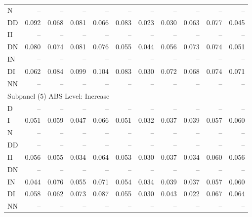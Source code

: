 {\begin{tabular}{lrrrrrrrrrr}
N      &    -- &    -- &    -- &    -- &     -- &     -- &     -- &     -- &     -- &     -- \\
DD     & 0.092 & 0.068 & 0.081 & 0.066 &  0.083 &  0.023 &  0.030 &  0.063 &  0.077 &  0.045 \\
II     &    -- &    -- &    -- &    -- &     -- &     -- &     -- &     -- &     -- &     -- \\
DN     & 0.080 & 0.074 & 0.081 & 0.076 &  0.055 &  0.044 &  0.056 &  0.073 &  0.074 &  0.051 \\
IN     &    -- &    -- &    -- &    -- &     -- &     -- &     -- &     -- &     -- &     -- \\
DI     & 0.062 & 0.084 & 0.099 & 0.104 &  0.083 &  0.030 &  0.072 &  0.068 &  0.074 &  0.071 \\
NN     &    -- &    -- &    -- &    -- &     -- &     -- &     -- &     -- &     -- &     -- \\ \hline
\multicolumn{11}{l}{Subpanel (5) ABS Level: Increase}                                        \\ \hline
D      &    -- &    -- &    -- &    -- &     -- &     -- &     -- &     -- &     -- &     -- \\
I      & 0.051 & 0.059 & 0.047 & 0.066 &  0.051 &  0.032 &  0.037 &  0.039 &  0.057 &  0.060 \\
N      &    -- &    -- &    -- &    -- &     -- &     -- &     -- &     -- &     -- &     -- \\
DD     &    -- &    -- &    -- &    -- &     -- &     -- &     -- &     -- &     -- &     -- \\
II     & 0.056 & 0.055 & 0.034 & 0.064 &  0.053 &  0.030 &  0.037 &  0.034 &  0.060 &  0.056 \\
DN     &    -- &    -- &    -- &    -- &     -- &     -- &     -- &     -- &     -- &     -- \\
IN     & 0.044 & 0.076 & 0.055 & 0.071 &  0.054 &  0.034 &  0.039 &  0.037 &  0.057 &  0.060 \\
DI     & 0.058 & 0.062 & 0.073 & 0.087 &  0.055 &  0.030 &  0.043 &  0.022 &  0.067 &  0.064 \\
NN     &    -- &    -- &    -- &    -- &     -- &     -- &     -- &     -- &     -- &     -- \\ \hline\hline
\end{tabular}}